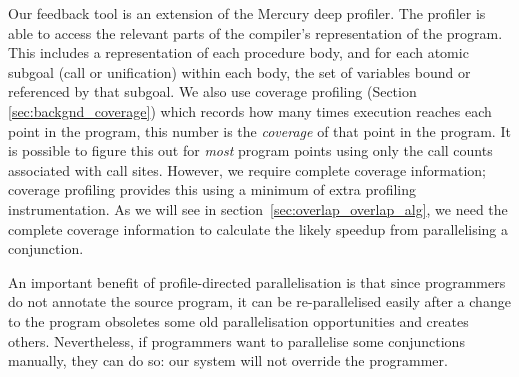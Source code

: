 Our feedback tool is an extension of the Mercury deep profiler.
The profiler is able to access the relevant parts of the compiler's
representation of the program.
This includes a representation of each procedure body,
and for each atomic subgoal (call or unification) within each body,
the set of variables bound or referenced by that subgoal.
We also use coverage profiling (Section \ref{sec:backgnd_coverage})
which records how many times execution reaches each point in the program,
this number is the \emph{coverage} of that point in the program.
It is possible to figure this out for \emph{most} program points using
only the call counts associated with call sites.
However, we require complete coverage information;
coverage profiling provides this using a minimum of extra profiling
instrumentation.
As we will see in section~\ref{sec:overlap_overlap_alg},
we need the complete coverage information
to calculate the likely speedup from parallelising a conjunction.


An important benefit of profile-directed parallelisation is that
since programmers do not annotate the source program,
it can be re-parallelised easily after a change to the program
obsoletes some old parallelisation opportunities and creates others.
Nevertheless, if programmers want to parallelise some conjunctions manually,
they can do so: our system will not override the programmer.

% 





